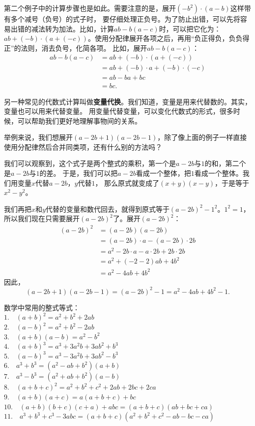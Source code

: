 \documentclass[12pt,UTF8]{ctexbook}
\theoremstyle{definition}
\theoremstyle{plain}
\begin{document}
第二个例子中的计算步骤也是如此。需要注意的是，展开$(- b^2)\cdot (a - b)$这样带有多个减号（负号）的式子时，
要仔细处理正负号。为了防止出错，可以先将容易出错的减法转为加法。比如，计算$ab - b(a-c)$时，可以把它化为：
$ab+(-b)\cdot(a + (-c))$。使用分配律展开各项之后，再用“负正得负，负负得正”的法则，消去负号，化简各项。
比如，展开$ab - b(a-c)$：
\begin{align*}
    ab - b(a-c) &= ab+(-b)\cdot(a + (-c)) \tag{减法化加法}\\
    &= ab + (-b)\cdot a + (-b) \cdot (-c) \tag{分配律展开} \\
    &= ab - ba + bc \tag{消去负号}\\
    &= bc.
\end{align*}

另一种常见的代数式计算叫做\textbf{变量代换}。我们知道，变量是用来代替数的。其实，变量也可以用来代替变量。
用变量代替变量，可以变化代数式的形式，很多时候，可以帮助我们更好地理解事物间的关系。

举例来说，我们想展开$(a - 2b + 1)(a - 2b - 1)$，除了像上面的例子一样直接使用分配律然后合并同类项，还有什么别的方法吗？

我们可以观察到，这个式子是两个整式的乘积，第一个是$a - 2b$与$1$的和，第二个是$a - 2b$与$1$的差。
于是，我们可以把$a - 2b$看成一个整体，把$1$看成一个整体。我们用变量$x$代替$a - 2b$，$y$代替$1$，
那么原式就变成了$(x + y)(x - y)$，于是等于$x^2 - y^2$。

我们再把$x$和$y$代替的变量和数代回去，就得到原式等于$(a - 2b)^2 - 1^2$。$1^2 = 1$，
所以我们现在只需要展开$(a - 2b)^2$了。展开$(a - 2b)^2$：
\begin{align*}
    (a - 2b)^2 &= (a - 2b)(a - 2b)  \\
    &= (a - 2b)\cdot a - (a - 2b) \cdot 2b  \\
    &= a^2 -2b\cdot a -a\cdot 2b + 2b\cdot 2b  \\
    &= a^2 + (-2 -2) ab + 4b^2  \\
    &= a^2 - 4ab + 4b^2 
\end{align*}
因此，
$$ (a - 2b + 1)(a - 2b - 1) = (a - 2b)^2 - 1 = a^2 - 4ab + 4b^2 - 1.$$

数学中常用的整式等式：\\
\indent $1. \quad (a + b)^2 = a^2 + b^2 + 2ab $ \\
\indent $2. \quad (a - b)^2 = a^2 + b^2 - 2ab $ \\
\indent $3. \quad (a + b)(a - b) = a^2 - b^2 $ \\
\indent $4. \quad (a + b)^3 = a^3 + 3a^2b + 3ab^2 + b^3 $ \\
\indent $5. \quad (a - b)^3 = a^3 - 3a^2b + 3ab^2 - b^3 $ \\
\indent $6. \quad a^3 + b^3 = (a^2 - ab + b^2)(a + b) $ \\
\indent $7. \quad a^3 - b^3 = (a^2 + ab + b^2)(a - b) $ \\
\indent $8. \quad (a + b + c)^2 = a^2 + b^2 + c^2 + 2ab + 2bc + 2ca $ \\
\indent $9. \quad (a + b)(a + c) = a(a + b + c) + bc $ \\
\indent $10. \quad (a + b)(b + c)(c + a) + abc = (a + b + c)(ab + bc + ca) $ \\
\indent $11.\quad  a^3+b^3+c^3 - 3abc = (a + b + c)(a^2+b^2+c^2-ab-bc-ca) $ 
\end{document}

